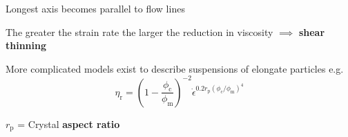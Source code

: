 \documentclass{beamer}
\begin{document}
\begin{frame}
\begin{columns}[t]
\begin{column}{0.5\textwidth}
     \vspace{0.5cm}
  
     Longest axis becomes parallel to flow lines \\

     \vspace{0.5cm}
  
     The greater the strain rate the larger the reduction in viscosity $\implies$ \textbf{shear thinning} \\

     \vspace{0.5cm}
  
     More complicated models exist to describe suspensions of elongate particles e.g. \\

     $$ \eta_{\text{r}} = \left(1 - \frac{\phi_{\text{c}}}{\phi_{\text{m}}}\right)^{-2} \dot{\epsilon}^{0.2 r_{\text{p}} (\phi_{\text{c}} / \phi_{\text{m}})^{4}} $$

     \vspace{0.2cm}
     
     $r_{\text{p}}$ = Crystal \textbf{aspect ratio} \\
    \end{column}

  \end{columns}
\end{frame}
\end{document}
